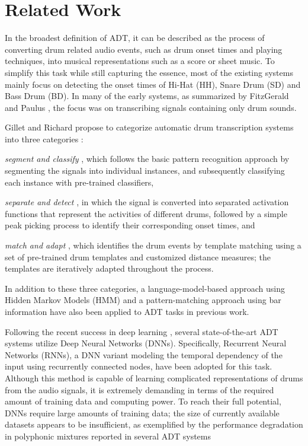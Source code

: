 \documentclass{article}
\begin{document}
\section{Related Work}\label{sec:related works}
In the broadest definition of ADT, it can be described as the process of converting drum related audio events, such as drum onset times and playing techniques, into musical representations such as a score or sheet music. To simplify this task while still capturing the essence, most of the existing systems mainly focus on detecting the onset times of Hi-Hat (HH), Snare Drum (SD) and Bass Drum (BD). In many of the early systems, as summarized by FitzGerald and Paulus \cite{FitzGerald2006}, the focus was on transcribing signals containing only drum sounds. %

Gillet and Richard propose to categorize automatic drum transcription systems into three categories \cite{Gillet2008}: 
\begin{inparaenum}[(i)]
	\item   \textit{segment and classify} \cite{Gillet2008, Gajhede2016}, which follows the basic pattern recognition approach by segmenting the signals into individual instances, and subsequently classifying each instance with pre-trained classifiers, 
    \item   \textit{separate and detect} \cite{Dittmar2014, Wu2015a, Roebel2015}, in which the signal is converted into separated activation functions that represent the activities of different drums, followed by a simple peak picking process to identify their corresponding onset times, and
    \item   \textit{match and adapt} \cite{Zils2002, Yoshii2007b}, which identifies the drum events by template matching using a set of pre-trained drum templates and customized distance measures; the templates are iteratively adapted throughout the process. 
\end{inparaenum} 
In addition to these three categories, a language-model-based approach using Hidden Markov Models (HMM) \cite{Paulus2009a} and a pattern-matching approach using bar information \cite{Thompson2014} have also been applied to ADT tasks in previous work. 

Following the recent success in deep learning \cite{Hinton2006}, several state-of-the-art ADT systems utilize Deep Neural Networks (DNNs). Specifically, Recurrent Neural Networks (RNNs), a DNN variant modeling the temporal dependency of the input using recurrently connected nodes, have been adopted for this task\cite{Vogl2016, Southall2016, Vogl2017}. Although this method is capable of learning complicated representations of drums from the audio signals, it is extremely demanding in terms of the required amount of training data and computing power. To reach their full potential, DNNs require large amounts of training data; the size of currently available datasets appears to be insufficient, as exemplified by the performance degradation in polyphonic mixtures reported in several ADT systems\cite{Wu2015a, Southall2016, Vogl2017}
\end{document}
